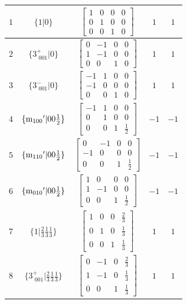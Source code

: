 \documentclass[fleqn,8pt]{jsarticle}
\begin{document}
\begin{longtable}{ccccc}
$ 1 $ & $ \{1|0\} $ & $ \begin{bmatrix} 1 & 0 & 0 & 0 \\ 0 & 1 & 0 & 0 \\ 0 & 0 & 1 & 0 \end{bmatrix} $ & $ 1 $ & $ 1 $ \\ \hline
$ 2 $ & $ \{3^{+}_{\,\,001}|0\} $ & $ \begin{bmatrix} 0 & -1 & 0 & 0 \\ 1 & -1 & 0 & 0 \\ 0 & 0 & 1 & 0 \end{bmatrix} $ & $ 1 $ & $ 1 $ \\ \hline
$ 3 $ & $ \{3^{-}_{\,\,001}|0\} $ & $ \begin{bmatrix} -1 & 1 & 0 & 0 \\ -1 & 0 & 0 & 0 \\ 0 & 0 & 1 & 0 \end{bmatrix} $ & $ 1 $ & $ 1 $ \\ \hline
$ 4 $ & $ \{{\rm m}_{100}{}'|0 0 \frac{1}{2}\} $ & $ \begin{bmatrix} -1 & 1 & 0 & 0 \\ 0 & 1 & 0 & 0 \\ 0 & 0 & 1 & \frac{1}{2} \end{bmatrix} $ & $ -1 $ & $ -1 $ \\ \hline
$ 5 $ & $ \{{\rm m}_{110}{}'|0 0 \frac{1}{2}\} $ & $ \begin{bmatrix} 0 & -1 & 0 & 0 \\ -1 & 0 & 0 & 0 \\ 0 & 0 & 1 & \frac{1}{2} \end{bmatrix} $ & $ -1 $ & $ -1 $ \\ \hline
$ 6 $ & $ \{{\rm m}_{010}{}'|0 0 \frac{1}{2}\} $ & $ \begin{bmatrix} 1 & 0 & 0 & 0 \\ 1 & -1 & 0 & 0 \\ 0 & 0 & 1 & \frac{1}{2} \end{bmatrix} $ & $ -1 $ & $ -1 $ \\ \hline
$ 7 $ & $ \{1|\frac{2}{3} \frac{1}{3} \frac{1}{3}\} $ & $ \begin{bmatrix} 1 & 0 & 0 & \frac{2}{3} \\ 0 & 1 & 0 & \frac{1}{3} \\ 0 & 0 & 1 & \frac{1}{3} \end{bmatrix} $ & $ 1 $ & $ 1 $ \\ \hline
$ 8 $ & $ \{3^{+}_{\,\,001}|\frac{2}{3} \frac{1}{3} \frac{1}{3}\} $ & $ \begin{bmatrix} 0 & -1 & 0 & \frac{2}{3} \\ 1 & -1 & 0 & \frac{1}{3} \\ 0 & 0 & 1 & \frac{1}{3} \end{bmatrix} $ & $ 1 $ & $ 1 $ \\ \hline

\end{longtable}
\end{document}
